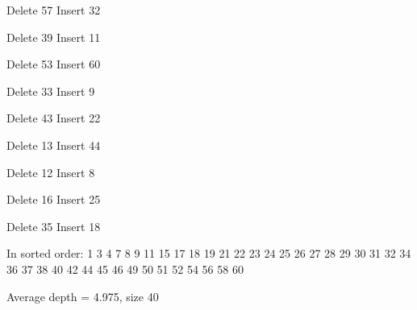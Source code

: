 \documentclass[a4paper,11pt]{article}
\begin{document}
Delete 57 Insert 32

Delete 39 Insert 11

Delete 53 Insert 60

Delete 33 Insert 9

Delete 43 Insert 22

Delete 13 Insert 44

Delete 12 Insert 8

Delete 16 Insert 25

Delete 35 Insert 18

In sorted order: 1 3 4 7 8 9 11 15 17 18 19 21 22 23 24 25 26 27 28 29 30 31 32 34 36 37 38 40 42 44 45 46 49 50 51 52 54 56 58 60 

Average depth = 4.975, size 40

\end{document}
